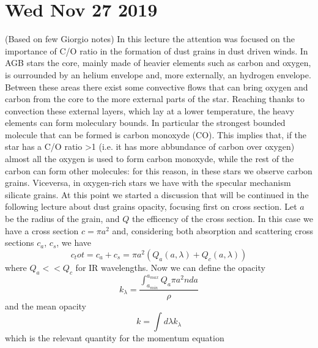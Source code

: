 \documentclass[main.tex]{subfiles}
\begin{document}
\section*{Wed Nov 27 2019}

(Based on few Giorgio notes) In this lecture the attention was focused on the importance of C/O ratio in the formation of dust grains in dust driven winds. In AGB stars the core, mainly made of heavier elements such as carbon and oxygen, is ourrounded by an helium envelope and, more externally, an hydrogen envelope. Between these areas there exist some convective flows that can bring oxygen and carbon from the core to the more external parts of the star. Reaching thanks to convection these external layers, which lay at a lower temperature, the heavy elements can form moleculary bounds. In particular the strongest bounded molecule that can be formed is carbon monoxyde (CO). This implies that, if the star has a C/O ratio >1 (i.e. it has more abbundance of carbon over oxygen) almost all the oxygen is used to form carbon monoxyde, while the rest of the carbon can form other molecules: for this reason, in these stars we observe carbon grains. Viceversa, in oxygen-rich stars we have with the specular mechanism silicate grains. At this point we started a discussion that will be continued in the following lecture about dust grains opacity, focusing first on cross section.
Let $a$ be the radius of the grain, and $Q$ the efficency of the cross section. In this case we have a cross section $c=\pi a^2$ and, considering both absorption and scattering cross sections $c_a$, $c_s$, we have
\begin{equation}
c_tot=c_a+c_s=\pi a^2(Q_a(a,\lambda)+Q_c(a,\lambda))
\end{equation}
where $Q_a<<Q_c$ for IR wavelengths.
Now we can define the opacity
\begin{equation}
k_\lambda=\frac{\int_{a_{min}}^{a_{max}}Q_a\pi a^2 n da}{\rho}
\end{equation}
and the mean opacity
\begin{equation}
k=\int d\lambda k_\lambda
\end{equation}
which is the relevant quantity for the momentum equation
\end{document}
